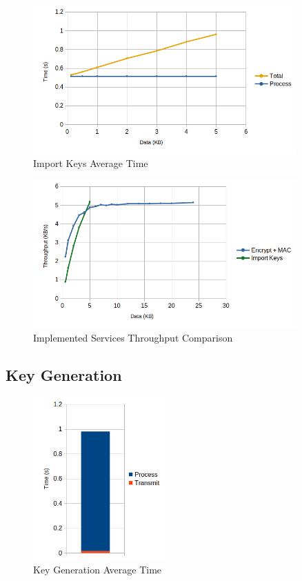 \begin{figure}[h!]
	\centering
	\includegraphics[width=0.9\textwidth]{./Images/import-time.png}
	\caption{Import Keys Average Time}
	\label{fig:performance:import-time}
\end{figure}

\begin{figure}[h!]
	\centering
	\includegraphics[width=0.9\textwidth]{./Images/services-tput.png}
	\caption{Implemented Services Throughput Comparison}
	\label{fig:performance:services-tput}
\end{figure}

\subsection{Key Generation}\label{chap:evaluation:services:key-gen}

\begin{figure}[h!]
	\centering
	\includegraphics[width=0.45\textwidth]{./Images/new-key-time.png}
	\caption{Key Generation Average Time}
	\label{fig:performance:new-key-time}
\end{figure}

